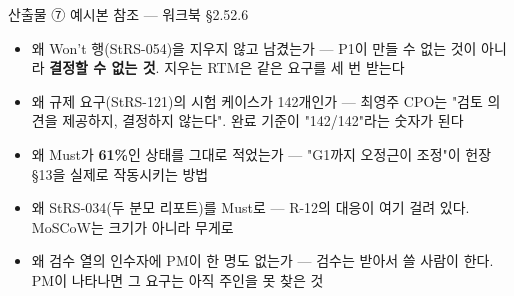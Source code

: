 \begin{frame}{산출물 ⑦ 예시본 참조 — 워크북 §2.5\til{}2.6}
\begin{itemize}
\item 왜 Won't 행(StRS-054)을 지우지 않고 남겼는가 — P1이 만들 수 없는 것이 아니라 \textbf{결정할 수 없는 것}. 지우는 RTM은 같은 요구를 세 번 받는다
\item 왜 규제 요구(StRS-121)의 시험 케이스가 142개인가 — 최영주 CPO는 "검토 의견을 제공하지, 결정하지 않는다". 완료 기준이 "142/142"라는 숫자가 된다
\item 왜 Must가 \textbf{61\%}인 상태를 그대로 적었는가 — "G1까지 오정근이 조정"이 헌장 §13을 실제로 작동시키는 방법
\item 왜 StRS-034(두 분모 리포트)를 Must로 — R-12의 대응이 여기 걸려 있다. MoSCoW는 크기가 아니라 무게로
\item 왜 검수 열의 인수자에 PM이 한 명도 없는가 — 검수는 받아서 쓸 사람이 한다. PM이 나타나면 그 요구는 아직 주인을 못 찾은 것
\end{itemize}
\end{frame}

